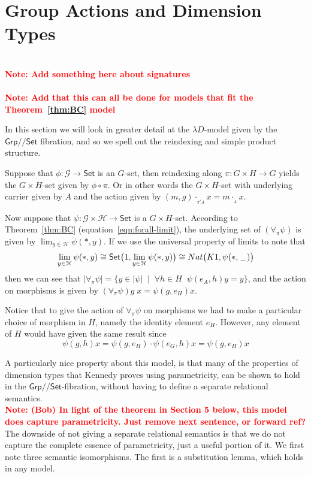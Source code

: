\documentclass[a4paper,UKenglish]{lipics}
\newcommand\note[1]{{ \bf \textcolor{red} {\vspace{2mm}\; \\ Note: #1\\}}}
\newcommand{\msf}[1]{\mathsf{#1}} %
\newcommand{\Grp}{\msf{Grp}}
\newcommand{\Set}{\msf{Set}}
\newcommand{\blank}{\, \underline{\hspace{2mm}} \,}
\newcommand{\act}[1]{\cdot_{_{#1}}}
\newcommand{\Lslice}[1]{#1/\!/\Set}
\newcommand{\GrpSet}{\Lslice{\Grp}}
\newcommand{\bbracket}[1]{\bigl( #1 \bigr)}
\begin{document}
\section{Group Actions and Dimension Types}\label{sec:MonSet}
\note{Add something here about signatures}
\note{Add that this can all be done for models that fit the Theorem~\ref{thm:BC} model}

\noindent In this section we will look in greater detail at the $\lambda D$-model given by the $\GrpSet$ fibration, and so we spell out the reindexing and simple product structure.


Suppose that $\phi: \mathcal{G}\rightarrow \Set$ is an $G$-set, then reindexing along $\pi : G \times H \rightarrow G$ yields the $G \times H$-set given by $\phi \circ \pi$. Or in other words the $G \times H$-set with underlying carrier given by $A$ and the action given by $(m,g) \act{\pi^{\ast}A} x = m \act{A} x$.

Now suppose that $\psi : \mathcal{G} \times \mathcal{H} \rightarrow\Set $ is a $G \times H$-set. According to Theorem~\ref{thm:BC} (equation~\eqref{eqn:forall-limit}),
the underlying set of $ (\forall _\pi \psi)$ is given by $\lim_{y\in \mathcal{H}} \psi (\ast, y)$. If we use the universal property of limits to note that
\[
 \lim_{y\in \mathcal{H}} \psi (\ast, y) \cong \Set \bbracket{1, \lim_{y\in \mathcal{H}} \psi (\ast, y)} \cong Nat \bbracket{K1, \psi (\ast, \blank)}
\]
then we can see that $|\forall_\pi \psi | = \{y \in |\psi| \; \; | \; \; \forall h\in H \; \; \psi(e_A, h) y = y \}$, and the action on morphisms is given by $(\forall_\pi \psi) g \; x = \psi (g, e_H) x$.

Notice that to give the action of $\forall_\pi \psi$ on morphisms we had to make a particular choice of morphism in $H$, namely the identity element $e_H$. However, any element of $H$ would have given the same result since
\[
  \psi (g, h) x = \psi (g, e_H) \cdot \psi (e_G, h) x = \psi (g, e_H) x
\]


A particularly nice property about this model, is that many of the properties of dimension types that Kennedy proves using parametricity, can be shown to hold in the $\GrpSet$-fibration, without having to define a separate relational semantics. \note{(Bob) In light of the theorem in Section 5 below, this model does capture parametricity. Just remove next sentence, or forward ref?} The downside of not giving a separate relational semantics is that we do not capture the complete essence of parametricity, just a useful portion of it. We first note three semantic isomorphisms. The first is a substitution lemma, which holds in any model.
\end{document}
